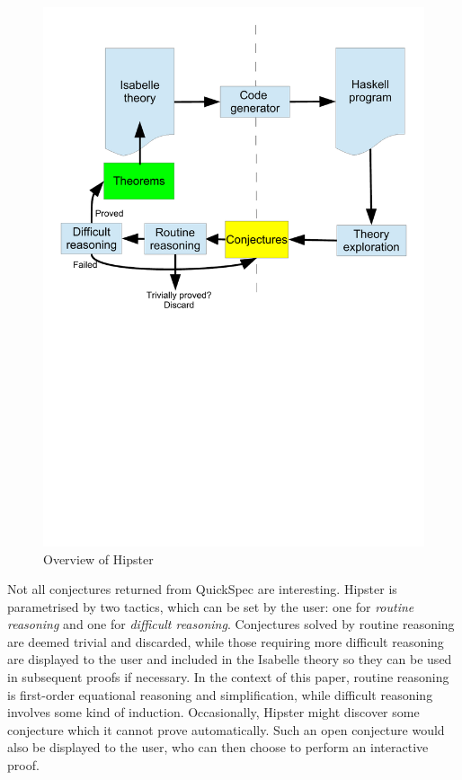 \begin{figure}[htbp]
\begin{center}
\includegraphics[scale=0.4]{hipster}
\caption{Overview of Hipster}
\label{fig:hipster}
\end{center}
\end{figure}

Not all conjectures returned from QuickSpec are interesting. Hipster is parametrised by two tactics, which can be set by the user: one for \emph{routine reasoning} and one for \emph{difficult reasoning}. Conjectures solved by routine reasoning are deemed trivial and discarded, while those requiring more difficult reasoning are displayed to the user and included in the Isabelle theory so they can be used in subsequent proofs if necessary. In the context of this paper, routine reasoning is first-order equational reasoning and simplification, while difficult reasoning involves some kind of induction. Occasionally, Hipster might discover some conjecture which it cannot prove automatically. Such an open conjecture would also be displayed to the user, who can then choose to perform an interactive proof.

